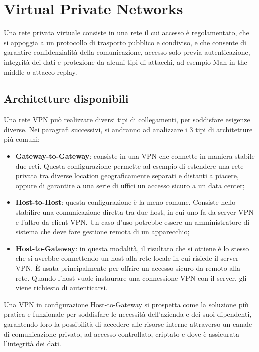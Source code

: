 \section{Virtual Private Networks}
Una rete privata virtuale consiste in una rete il cui accesso è regolamentato, che si appoggia a un protocollo di trasporto pubblico e condiviso, e che consente di garantire confidenzialità della comunicazione, accesso solo previa autenticazione, integrità dei dati e protezione da alcuni tipi di attacchi, ad esempio Man-in-the-middle o attacco replay.

\subsection{Architetture disponibili}
Una rete VPN può realizzare diversi tipi di collegamenti, per soddisfare esigenze diverse. Nei paragrafi successivi, si andranno ad analizzare i 3 tipi di architetture più comuni:
\begin{itemize}
    \item \textbf{Gateway-to-Gateway}: consiste in una VPN che connette in maniera stabile due reti. Questa configurazione permette ad esempio di estendere una rete privata tra diverse location geograficamente separati e distanti a piacere, oppure di garantire a una serie di uffici un accesso sicuro a un data center;
    \item \textbf{Host-to-Host}: questa configurazione è la meno comune. Consiste nello stabilire una comunicazione diretta tra due host, in cui uno fa da server VPN e l'altro da client VPN. Un caso d'uso potrebbe essere un amministratore di sistema che deve fare gestione remota di un apparecchio;
    \item \textbf{Host-to-Gateway}: in questa modalità, il risultato che si ottiene è lo stesso che si avrebbe connettendo un host alla rete locale in cui risiede il server VPN. È usata principalmente per offrire un accesso sicuro da remoto alla rete. Quando l'host vuole instaurare una connessione VPN con il server, gli viene richiesto di autenticarsi.
\end{itemize}

Una VPN in configurazione Host-to-Gateway si prospetta come la soluzione più pratica e funzionale per soddisfare le necessità dell'azienda e dei suoi dipendenti, garantendo loro la possibilità di accedere alle risorse interne attraverso un canale di comunicazione privato, ad accesso controllato, criptato e dove è assicurata l'integrità dei dati.

